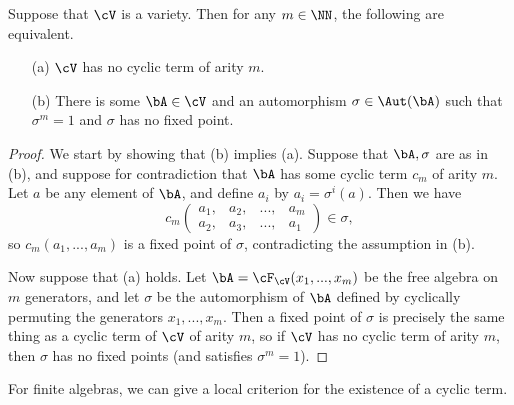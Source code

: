 \begin{prop} Suppose that $\cV$ is a variety. Then for any $m \in \NN$, the following are equivalent.
\begin{itemize}
\item[(a)] $\cV$ has no cyclic term of arity $m$.
\item[(b)] There is some $\bA \in \cV$ and an automorphism $\sigma \in \Aut(\bA)$ such that $\sigma^m = 1$ and $\sigma$ has no fixed point.
\end{itemize}
\end{prop}
\begin{proof} We start by showing that (b) implies (a). Suppose that $\bA, \sigma$ are as in (b), and suppose for contradiction that $\bA$ has some cyclic term $c_m$ of arity $m$. Let $a$ be any element of $\bA$, and define $a_i$ by $a_i = \sigma^i(a)$. Then we have
\[
c_m\begin{pmatrix}a_1, & a_2, & ..., & a_m\\ a_2, & a_3, & ..., & a_1\end{pmatrix} \in \sigma,
\]
so $c_m(a_1, ..., a_m)$ is a fixed point of $\sigma$, contradicting the assumption in (b).

Now suppose that (a) holds. Let $\bA = \cF_\cV(x_1, ..., x_m)$ be the free algebra on $m$ generators, and let $\sigma$ be the automorphism of $\bA$ defined by cyclically permuting the generators $x_1, ..., x_m$. Then a fixed point of $\sigma$ is precisely the same thing as a cyclic term of $\cV$ of arity $m$, so if $\cV$ has no cyclic term of arity $m$, then $\sigma$ has no fixed points (and satisfies $\sigma^m = 1$).
\end{proof}

For finite algebras, we can give a local criterion for the existence of a cyclic term.


